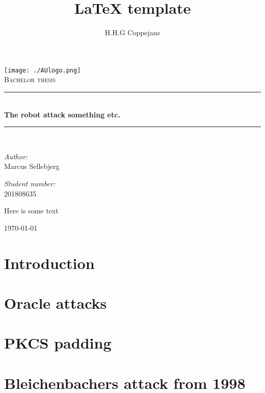 \documentclass[a4paper,12pt]{report}
\author{H.H.G Coppejans}
\title{LaTeX template}
\newcommand{\HRule}{\rule{\linewidth}{0.5mm}}
\begin{document}
\setlength{\parskip}{6pt}
\begin{titlepage}
\begin{center}
\texttt{[image: ./AUlogo.png]}\\[0.4cm]    
\textsc{\Large Bachelor thesis}\\[0.5cm]
\HRule \\[0.4cm]
{ \huge \bfseries The robot attack something etc.}\\[0.4cm]
\HRule \\[0.4cm]
\begin{minipage}{0.4\textwidth}
\begin{flushleft} \large
\emph{Author:}\\
Marcus Sellebjerg
\end{flushleft}
\end{minipage}
\begin{minipage}{0.4\textwidth}
\begin{flushright} \large
\emph{Student number:} \\
201808635
\end{flushright}
\end{minipage}
\vspace{10mm}
\begin{center}
    Here is some text
\end{center}
\vfill
{\large \today}
\end{center}
\end{titlepage}


\footnotesize
\normalsize
\setcounter{chapter}{1}
\renewcommand{\thesection}{\arabic{section}}

\tableofcontents
\newpage

\section{Introduction}
\section{Oracle attacks}
\section{PKCS padding}
\section{Bleichenbachers attack from 1998}
\end{document}
